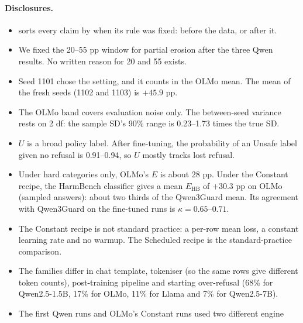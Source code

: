 \documentclass{article}
\newcommand{\Ehb}{E_{\mathrm{HB}}}
\begin{document}
\paragraph{Disclosures.}
\begin{itemize}
  \item {} sorts every claim by when its rule was fixed: before
        the data, or after it.
  \item We fixed the 20--55 pp window for partial erosion after the three Qwen
        results. No written reason for 20 and 55 exists.
  \item Seed 1101 chose the setting, and it counts in the OLMo mean. The mean
        of the fresh seeds (1102 and 1103) is $+45.9$ pp.
  \item The OLMo band covers evaluation noise only. The between-seed variance
        rests on 2 df: the sample SD's 90\% range is 0.23--1.73 times the true
        SD.
  \item $U$ is a broad policy label. After fine-tuning, the probability of an
        Unsafe label given no refusal is 0.91--0.94, so $U$ mostly tracks lost
        refusal.
  \item Under hard categories only, OLMo's $E$ is about 28 pp. Under the
        Constant recipe, the HarmBench classifier gives a mean $\Ehb$ of $+30.3$
        pp on OLMo (sampled answers): about two thirds of the Qwen3Guard mean.
        Its agreement with Qwen3Guard on the fine-tuned runs is
        $\kappa = 0.65$--$0.71$.
  \item The Constant recipe is not standard practice: a per-row mean loss, a
        constant learning rate and no warmup. The Scheduled recipe is the
        standard-practice comparison.
  \item The families differ in chat template, tokeniser (so the same rows give
        different token counts), post-training pipeline and starting
        over-refusal (68\% for Qwen2.5-1.5B, 17\% for OLMo, 11\% for Llama and
        7\% for Qwen2.5-7B).
  \item The first Qwen runs and OLMo's Constant runs used two different engine

\end{itemize}
\end{document}
